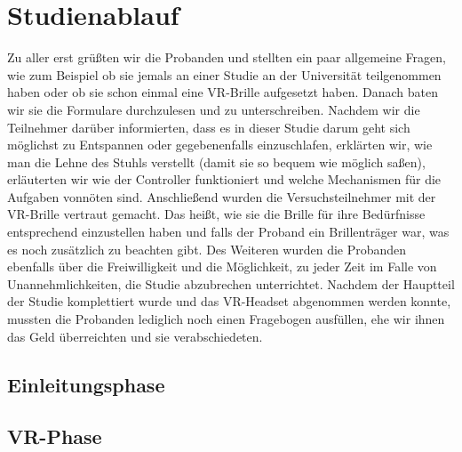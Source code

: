 \section{Studienablauf}

Zu aller erst grüßten wir die Probanden und stellten ein paar allgemeine Fragen, wie zum Beispiel ob sie jemals an einer Studie an der Universität teilgenommen haben oder ob sie schon einmal eine VR-Brille aufgesetzt haben. Danach baten wir sie die Formulare durchzulesen und zu unterschreiben. Nachdem wir die Teilnehmer darüber informierten, dass es in dieser Studie darum geht sich möglichst zu Entspannen oder gegebenenfalls einzuschlafen, erklärten wir, wie man die Lehne des Stuhls verstellt (damit sie so bequem wie möglich saßen), erläuterten wir wie der Controller funktioniert und welche Mechanismen für die Aufgaben vonnöten sind.
Anschließend wurden die Versuchsteilnehmer mit der VR-Brille vertraut gemacht. Das heißt, wie sie die Brille für ihre Bedürfnisse entsprechend einzustellen haben und falls der Proband ein Brillenträger war, was es noch zusätzlich zu beachten gibt.
Des Weiteren wurden die Probanden ebenfalls über die Freiwilligkeit und die Möglichkeit, zu jeder Zeit im Falle von Unannehmlichkeiten, die Studie abzubrechen unterrichtet.
Nachdem der Hauptteil der Studie komplettiert wurde und das VR-Headset abgenommen werden konnte, mussten die Probanden lediglich noch einen Fragebogen ausfüllen, ehe wir ihnen das Geld überreichten und sie verabschiedeten.

\subsection{Einleitungsphase}
\subsection{VR-Phase}
